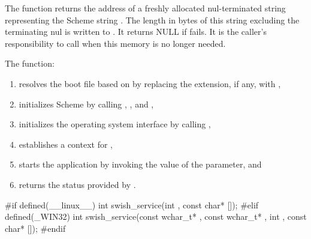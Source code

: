 \begin{function}
\end{function}

The  function returns the address of a
freshly allocated nul-terminated string representing the Scheme string
. The length in bytes of this string excluding the terminating
nul is written to . It returns NULL if
 fails. It is the caller's responsibility to call
 when this memory is no longer needed.

\begin{function}
\end{function}

The  function:
\begin{enumerate} %
\item resolves the boot file based on
   by replacing the extension, if any, with
  ,
\item initializes Scheme by calling ,
  , and ,
\item initializes the operating system interface by calling ,
\item establishes a context for ,
\item starts the application by invoking the value of the  parameter, and
\item returns the status provided by .
\end{enumerate}

\label{swishservice}
\begin{function}
  \codebegin
#if defined(\_\_linux\_\_)
int swish\_service(int , const char* []);
#elif defined(\_WIN32)
int swish\_service(const wchar\_t* , const wchar\_t* ,
                  int , const char* []);
#endif \strut\codeend
\end{function}

